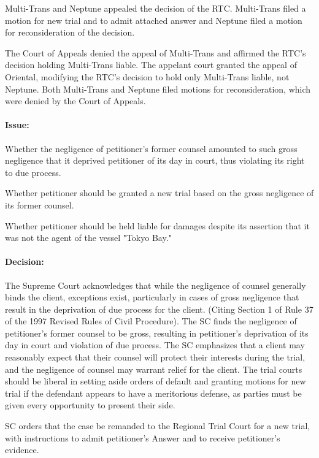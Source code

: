 \documentclass[
12pt,
oneside,
onehalfspacing,
headsepline
]{DigestCollection}
\begin{document}
Multi-Trans and Neptune appealed the decision of the RTC. Multi-Trans filed a motion for new trial and to admit attached answer and Neptune filed a motion for reconsideration of the decision.

The Court of Appeals denied the appeal of Multi-Trans and affirmed the RTC's decision holding Multi-Trans liable. The appelant court granted the appeal of Oriental, modifying the RTC's decision to hold only Multi-Trans liable, not Neptune. Both Multi-Trans and Neptune filed motions for reconsideration, which were denied by the Court of Appeals.

\paragraph{Issue:}
\label{fa5d3fb0-1255-11ef-aa24-9916ea601717}


Whether the negligence of petitioner's former counsel amounted to such gross negligence that it deprived petitioner of its day in court, thus violating its right to due process.

Whether petitioner should be granted a new trial based on the gross negligence of its former counsel.

Whether petitioner should be held liable for damages despite its assertion that it was not the agent of the vessel "Tokyo Bay."

\paragraph{Decision:}
\label{f81ec160-1255-11ef-aa24-9916ea601717}


The Supreme Court acknowledges that while the negligence of counsel generally binds the client, exceptions exist, particularly in cases of gross negligence that result in the deprivation of due process for the client. (Citing Section 1 of Rule 37 of the 1997 Revised Rules of Civil Procedure). The SC finds the negligence of petitioner's former counsel to be gross, resulting in petitioner's deprivation of its day in court and violation of due process. The SC emphasizes that a client may reasonably expect that their counsel will protect their interests during the trial, and the negligence of counsel may warrant relief for the client. The trial courts should be liberal in setting aside orders of default and granting motions for new trial if the defendant appears to have a meritorious defense, as parties must be given every opportunity to present their side. 

SC orders that the case be remanded to the Regional Trial Court for a new trial, with instructions to admit petitioner's Answer and to receive petitioner's evidence. 
\end{document}
